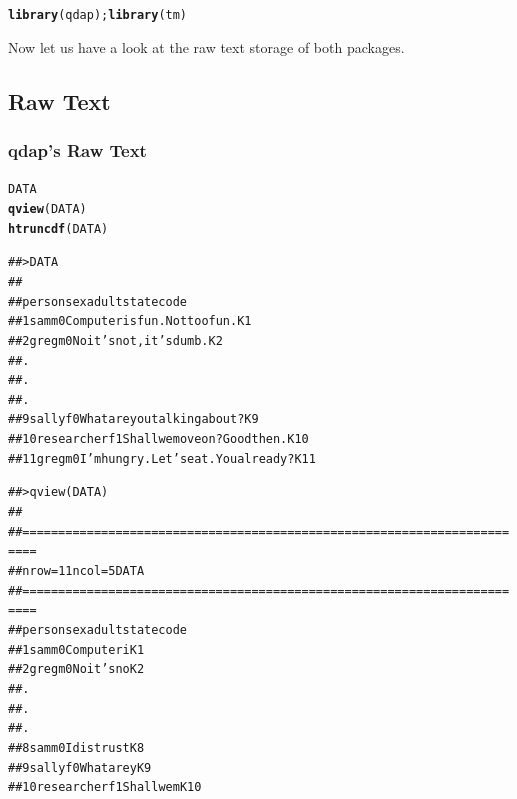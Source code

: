 \documentclass{article}\usepackage[]{graphicx}\usepackage[]{color}
\makeatletter
\newcommand{\hlstd}[1]{\textcolor[rgb]{0.345,0.345,0.345}{#1}}%
\newcommand{\hlkwd}[1]{\textcolor[rgb]{0.737,0.353,0.396}{\textbf{#1}}}%
\newenvironment{kframe}{%
 \def\at@end@of@kframe{}%
 \ifinner\ifhmode%
  \def\at@end@of@kframe{\end{minipage}}%
  \begin{minipage}{\columnwidth}%
 \fi\fi%
 \def\FrameCommand##1{\hskip\@totalleftmargin \hskip-\fboxsep
 \colorbox{shadecolor}{##1}\hskip-\fboxsep
     \hskip-\linewidth \hskip-\@totalleftmargin \hskip\columnwidth}%
 \MakeFramed {\advance\hsize-\width
   \@totalleftmargin\z@ \linewidth\hsize
   \@setminipage}}%
 {\par\unskip\endMakeFramed%
 \at@end@of@kframe}
\newenvironment{knitrout}{}{} %
\makeatother
\begin{document}
\begin{knitrout}
\color{fgcolor}\begin{kframe}
\begin{alltt}
\hlkwd{library}\hlstd{(qdap);} \hlkwd{library}\hlstd{(tm)}
\end{alltt}
\end{kframe}
\end{knitrout}


\noindent Now let us have a look at the raw text storage of both packages. \\ 

\subsection{Raw Text}
\subsubsection{qdap's Raw Text}

\begin{knitrout}
\color{fgcolor}\begin{kframe}
\begin{alltt}
\hlstd{DATA}
\hlkwd{qview}\hlstd{(DATA)}
\hlkwd{htruncdf}\hlstd{(DATA)}
\end{alltt}
\end{kframe}
\end{knitrout}


\begin{knitrout}
\color{fgcolor}\begin{kframe}
\begin{alltt}
## > DATA
##
##        person sex adult                                 state code
## 1         sam   m     0         Computer is fun. Not too fun.   K1
## 2        greg   m     0               No it's not, it's dumb.   K2
## .
## .
## .
## 9       sally   f     0           What are you talking about?   K9
## 10 researcher   f     1         Shall we move on?  Good then.  K10
## 11       greg   m     0 I'm hungry.  Let's eat.  You already?  K11
\end{alltt}
\end{kframe}
\end{knitrout}

\begin{knitrout}
\color{fgcolor}\begin{kframe}
\begin{alltt}
## > qview(DATA)
##
## ========================================================================
## nrow =  11           ncol =  5             DATA
## ========================================================================
##        person sex adult      state code
## 1         sam   m     0 Computer i   K1
## 2        greg   m     0 No it's no   K2
## .
## .
## .
## 8         sam   m     0 I distrust   K8
## 9       sally   f     0 What are y   K9
## 10 researcher   f     1 Shall we m  K10
\end{alltt}
\end{kframe}
\end{knitrout}
\end{document}
